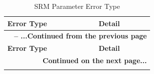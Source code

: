 \documentclass[main\_\_EN.tex]{subfiles}
\begin{document}
\begin{longtable}[c]{ |p{6cm}|p{10cm}| }
    \caption{SRM Parameter Error Type}
    \label{tab:srm_param_err}\\\hline

    \rowcolor{lightgray}
    \textbf{Error Type} & \textbf{Detail} \\\hline
    \endfirsthead


    \multicolumn{2}{c}{\bfseries \tablename\ \thetable{} -- ...Continued from the previous page}\\\hline
    \rowcolor{lightgray}
    \textbf{Error Type} & \textbf{Detail} \\\hline
    \endhead

    \multicolumn{2}{r}{\textbf{Continued on the next page...}} \\
    \endfoot

    \endlastfoot


\end{longtable}
\end{document}
